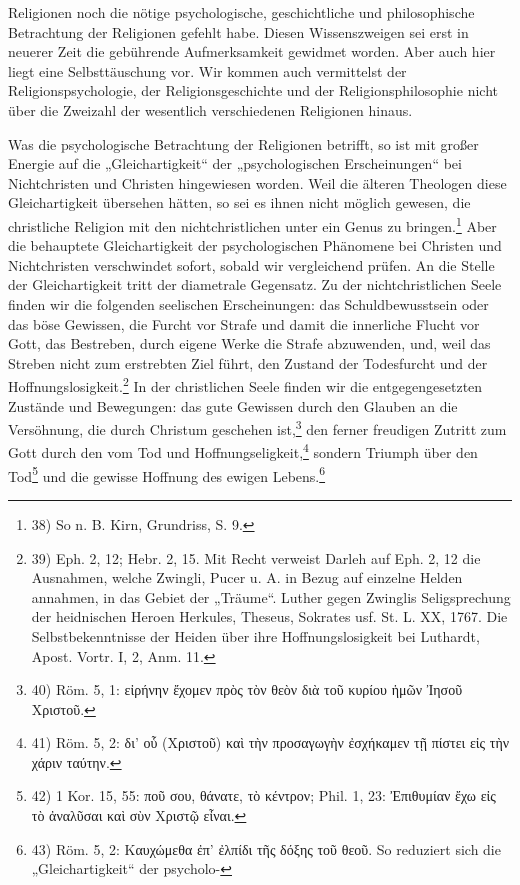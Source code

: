 
Religionen noch die nötige psychologische, geschichtliche und philosophische Betrachtung der Religionen gefehlt habe. Diesen Wissenszweigen sei erst in neuerer Zeit die gebührende Aufmerksamkeit gewidmet worden. Aber auch hier liegt eine Selbsttäuschung vor. Wir kommen auch vermittelst der Religionspsychologie, der Religionsgeschichte und der Religionsphilosophie nicht über die Zweizahl der wesentlich verschiedenen Religionen hinaus.

Was die psychologische Betrachtung der Religionen betrifft, so ist mit großer Energie auf die „Gleichartigkeit“ der „psychologischen Erscheinungen“ bei Nichtchristen und Christen hingewiesen worden. Weil die älteren Theologen diese Gleichartigkeit übersehen hätten, so sei es ihnen nicht möglich gewesen, die christliche Religion mit den nichtchristlichen unter ein Genus zu bringen.\footnote{38) So n. B. Kirn, Grundriss, S. 9.} Aber die behauptete Gleichartigkeit der psychologischen Phänomene bei Christen und Nichtchristen verschwindet sofort, sobald wir vergleichend prüfen. An die Stelle der Gleichartigkeit tritt der diametrale Gegensatz. Zu der nichtchristlichen Seele finden wir die folgenden seelischen Erscheinungen: das Schuldbewusstsein oder das böse Gewissen, die Furcht vor Strafe und damit die innerliche Flucht vor Gott, das Bestreben, durch eigene Werke die Strafe abzuwenden, und, weil das Streben nicht zum erstrebten Ziel führt, den Zustand der Todesfurcht und der Hoffnungslosigkeit.\footnote{39) Eph. 2, 12; Hebr. 2, 15. Mit Recht verweist Darleh auf Eph. 2, 12 die Ausnahmen, welche Zwingli, Pucer u. A. in Bezug auf einzelne Helden annahmen, in das Gebiet der „Träume“. Luther gegen Zwinglis Seligsprechung der heidnischen Heroen Herkules, Theseus, Sokrates usf. St. L. XX, 1767. Die Selbstbekenntnisse der Heiden über ihre Hoffnungslosigkeit bei Luthardt, Apost. Vortr. I, 2, Anm. 11.} In der christlichen Seele finden wir die entgegengesetzten Zustände und Bewegungen: das gute Gewissen durch den Glauben an die Versöhnung, die durch Christum geschehen ist,\footnote{40) Röm. 5, 1: \textgreek{εἰρήνην ἔχομεν πρὸς τὸν θεὸν διὰ τοῦ κυρίου ἡμῶν Ἰησοῦ Χριστοῦ}.} den ferner freudigen Zutritt zum Gott durch den vom Tod und Hoffnungseligkeit,\footnote{41) Röm. 5, 2: \textgreek{δι’ οὗ (Χριστοῦ) καὶ τὴν προσαγωγὴν ἐσχήκαμεν τῇ πίστει εἰς τὴν χάριν ταύτην}.} sondern Triumph über den Tod\footnote{42) 1 Kor. 15, 55: \textgreek{ποῦ σου, θάνατε, τὸ κέντρον;} Phil. 1, 23: \textgreek{Ἐπιθυμίαν ἔχω εἰς τὸ ἀναλῦσαι καὶ σὺν Χριστῷ εἶναι}.} und die gewisse Hoffnung des ewigen Lebens.\footnote{43) Röm. 5, 2: \textgreek{Καυχώμεθα ἐπ’ ἐλπίδι τῆς δόξης τοῦ θεοῦ}. So reduziert sich die „Gleichartigkeit“ der psycholo-}
